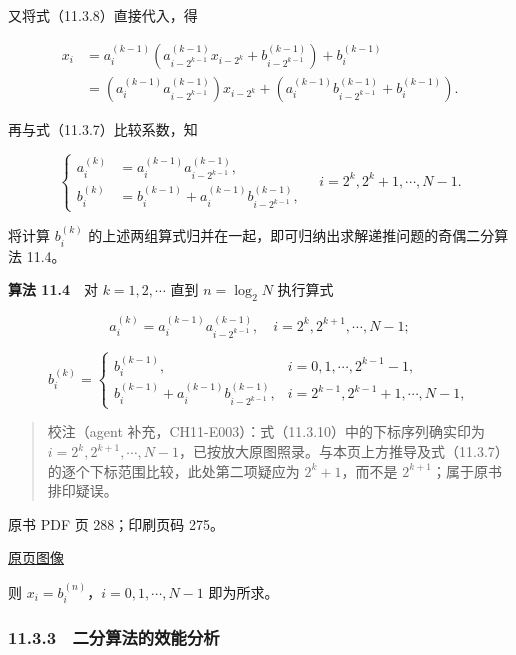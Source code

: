 又将式（11.3.8）直接代入，得

\[
\begin{aligned}
x_i
&=a_i^{(k-1)}\left(a_{i-2^{k-1}}^{(k-1)}x_{i-2^k}+b_{i-2^{k-1}}^{(k-1)}\right)+b_i^{(k-1)}\\
&=\left(a_i^{(k-1)}a_{i-2^{k-1}}^{(k-1)}\right)x_{i-2^k}+\left(a_i^{(k-1)}b_{i-2^{k-1}}^{(k-1)}+b_i^{(k-1)}\right).
\end{aligned}
\]

再与式（11.3.7）比较系数，知

\[
\left\{
\begin{aligned}
a_i^{(k)}&=a_i^{(k-1)}a_{i-2^{k-1}}^{(k-1)},\\
b_i^{(k)}&=b_i^{(k-1)}+a_i^{(k-1)}b_{i-2^{k-1}}^{(k-1)},
\end{aligned}
\right.
\quad i=2^k,2^k+1,\cdots,N-1.
\]

将计算 \(b_i^{(k)}\) 的上述两组算式归并在一起，即可归纳出求解递推问题的奇偶二分算法 11.4。

\textbf{算法 11.4}　对 \(k=1,2,\cdots\) 直到 \(n=\log_2 N\) 执行算式

\[
a_i^{(k)}=a_i^{(k-1)}a_{i-2^{k-1}}^{(k-1)},\quad i=2^k,2^{k+1},\cdots,N-1;
\tag{11.3.10}
\]

\[
b_i^{(k)}=
\begin{cases}
b_i^{(k-1)},& i=0,1,\cdots,2^{k-1}-1,\\
b_i^{(k-1)}+a_i^{(k-1)}b_{i-2^{k-1}}^{(k-1)},& i=2^{k-1},2^{k-1}+1,\cdots,N-1,
\end{cases}
\tag{11.3.11}
\]

\begin{quote}
校注（agent 补充，CH11-E003）：式（11.3.10）中的下标序列确实印为 \(i=2^k,2^{k+1},\cdots,N-1\)，已按放大原图照录。与本页上方推导及式（11.3.7）的逐个下标范围比较，此处第二项疑应为 \(2^k+1\)，而不是 \(2^{k+1}\)；属于原书排印疑误。
\end{quote}

\clearpage

原书 PDF 页 288；印刷页码 275。

\href{source-images/pdf-288.jpeg}{原页图像}

则 \(x_i=b_i^{(n)}\)，\(i=0,1,\cdots,N-1\) 即为所求。

\subsubsection{11.3.3　二分算法的效能分析}\label{ch11-ux4e8cux5206ux7b97ux6cd5ux7684ux6548ux80fdux5206ux6790-1}

